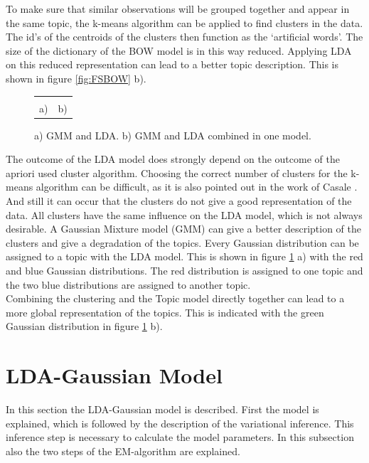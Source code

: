 To make sure that similar observations will be grouped together and appear in the same topic, the k-means algorithm can be applied to find clusters in the data. The id's of the centroids of the clusters then function as the `artificial words'. The size of the dictionary of the BOW model is in this way reduced. Applying LDA on this reduced representation can lead to a better topic description. This is shown in figure \ref{fig:FSBOW} b).\\

\begin{figure}[h]
\centering
\begin{tabular}{c c} 
\def\svgwidth{0.45\textwidth}  & \def\svgwidth{0.45\textwidth} \\
a) & b)
\end{tabular}
\caption{a) GMM and LDA. b) GMM and LDA combined in one model.}
\label{fig:GMM+LDA}
\end{figure}

The outcome of the LDA model does strongly depend on the outcome of the apriori used cluster algorithm. Choosing the correct number of clusters for the k-means algorithm can be difficult, as it is also pointed out in the work of Casale \cite{Casale:2009}. And still it can occur that the clusters do not give a good representation of the data. All clusters have the same influence on the LDA model, which is not always desirable. A Gaussian Mixture model (GMM) can give a better description of the clusters and give a degradation of the topics. Every Gaussian distribution can be assigned to a topic with the LDA model. This is shown in figure \ref{fig:GMM+LDA} a) with the red and blue Gaussian distributions. The red distribution is assigned to one topic and the two blue distributions are assigned to another topic.\\

Combining the clustering and the Topic model directly together can lead to a more global representation of the topics. This is indicated with the green Gaussian distribution in figure \ref{fig:GMM+LDA} b). 




\section{LDA-Gaussian Model}
In this section the LDA-Gaussian model is described. First the model is explained, which is followed by the description of the variational inference. This inference step is necessary to calculate the model parameters. In this subsection also the two steps of the EM-algorithm are explained.


